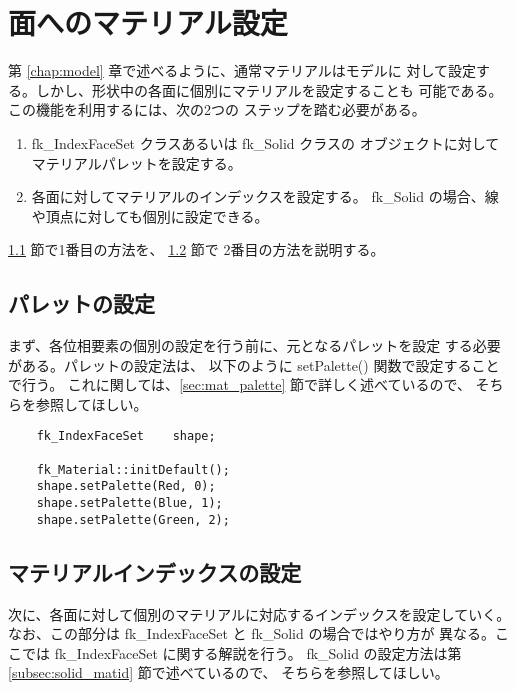 \section{面へのマテリアル設定} \label{sec:ifs_mat}
第 \ref{chap:model} 章で述べるように、通常マテリアルはモデルに
対して設定する。しかし、形状中の各面に個別にマテリアルを設定することも
可能である。この機能を利用するには、次の2つの
ステップを踏む必要がある。
\begin{enumerate}
 \item fk\_IndexFaceSet クラスあるいは fk\_Solid クラスの
	オブジェクトに対してマテリアルパレットを設定する。
 \item 各面に対してマテリアルのインデックスを設定する。
	fk\_Solid の場合、線や頂点に対しても個別に設定できる。
\end{enumerate}
\ref{subsec:ifs_palette} 節で1番目の方法を、
\ref{subsec:ifs_matid} 節で
2番目の方法を説明する。
\subsection{パレットの設定} \label{subsec:ifs_palette}
まず、各位相要素の個別の設定を行う前に、元となるパレットを設定
する必要がある。パレットの設定法は、
以下のように setPalette() 関数で設定することで行う。
これに関しては、\ref{sec:mat_palette} 節で詳しく述べているので、
そちらを参照してほしい。
\\
\begin{breakbox}
\begin{verbatim}
    fk_IndexFaceSet    shape;

    fk_Material::initDefault();
    shape.setPalette(Red, 0);
    shape.setPalette(Blue, 1);
    shape.setPalette(Green, 2);
\end{verbatim}
\end{breakbox}
\subsection{マテリアルインデックスの設定} \label{subsec:ifs_matid}
次に、各面に対して個別のマテリアルに対応するインデックスを設定していく。
なお、この部分は fk\_IndexFaceSet と fk\_Solid の場合ではやり方が
異なる。ここでは fk\_IndexFaceSet に関する解説を行う。
fk\_Solid の設定方法は第 \ref{subsec:solid_matid} 節で述べているので、
そちらを参照してほしい。

